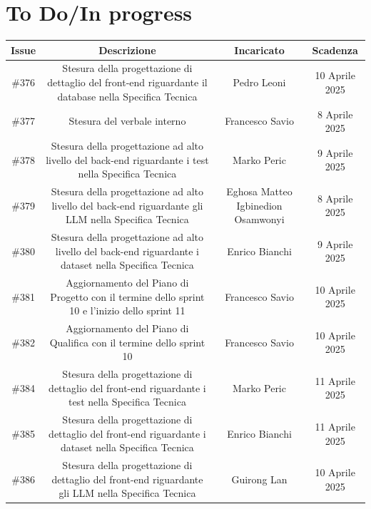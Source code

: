 \documentclass[a4paper, 12pt]{article}
\begin{document}
\section{To Do/In progress}
\begin{tabularx}{\textwidth}{|c|C|C|C|}
    \hline
        \textbf{Issue} & \textbf{Descrizione} & \textbf{Incaricato} & \textbf{Scadenza}\\
    \hline
        \#376 & Stesura della progettazione di dettaglio del front-end riguardante il database nella Specifica Tecnica & Pedro Leoni & 10 Aprile 2025\\
    \hline
        \#377 & Stesura del verbale interno & Francesco Savio & 8 Aprile 2025\\
    \hline    
        \#378 & Stesura della progettazione ad alto livello del back-end riguardante i test nella Specifica Tecnica & Marko Peric & 9 Aprile 2025\\
    \hline
        \#379 & Stesura della progettazione ad alto livello del back-end riguardante gli LLM nella Specifica Tecnica & Eghosa Matteo Igbinedion Osamwonyi & 8 Aprile 2025\\
    \hline
        \#380 & Stesura della progettazione ad alto livello del back-end riguardante i dataset nella Specifica Tecnica & Enrico Bianchi & 9 Aprile 2025\\
    \hline
        \#381 & Aggiornamento del Piano di Progetto con il termine dello sprint 10 e l'inizio dello sprint 11 & Francesco Savio & 10 Aprile 2025\\
    \hline
        \#382 & Aggiornamento del Piano di Qualifica con il termine dello sprint 10 & Francesco Savio & 10 Aprile 2025\\
    \hline
        \#384 & Stesura della progettazione di dettaglio del front-end riguardante i test nella Specifica Tecnica & Marko Peric & 11 Aprile 2025\\
    \hline
        \#385 & Stesura della progettazione di dettaglio del front-end riguardante i dataset nella Specifica Tecnica & Enrico Bianchi & 11 Aprile 2025\\
    \hline
        \#386 & Stesura della progettazione di dettaglio del front-end riguardante gli LLM nella Specifica Tecnica & Guirong Lan & 10 Aprile 2025\\
    \hline
 \end{tabularx}
\end{document}
